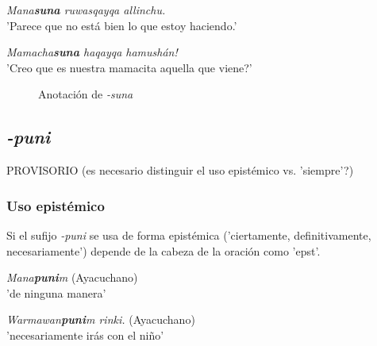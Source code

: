 \documentclass[a4paper,11pt,DIV12]{scrartcl}
\begin{document}
\begin{examples}
 \item {\em Mana\textbf{suna} ruwasqayqa allinchu.}\\
      'Parece que no est\'a bien lo que estoy haciendo.'
\item\label{Ex:suna} {\em Mamacha\textbf{suna} haqayqa hamush\'an!}\\
      '{\textquestiondown}Creo que es nuestra mamacita aquella que viene?'\\
    		\hfill{\small \citep[235]{Cusi2}}
\end{examples}

\begin{figure}
 \begin{center}
\caption{Anotaci\'on de {\em -suna}}\label{Fig:suna}
 \end{center}
\end{figure}

  \subsection{{\em-puni}}
PROVISORIO (es necesario distinguir el uso epist\'emico vs. 'siempre'?)
  \subsubsection{Uso epist\'emico}
Si el sufijo {\em -puni} se usa de forma epist\'emica ('ciertamente, definitivamente, necesariamente') depende de la cabeza de la oraci\'on como 'epst'.

\begin{examples}
 \item {\em Mana\textbf{puni}m} (Ayacuchano)\\
      'de ninguna manera'
 \item {\em Warmawan\textbf{puni}m rinki.} (Ayacuchano)\\
      'necesariamente ir\'as con el ni\~no'\\
    		\hfill{\small \citep[128]{Soto76a}}
\end{examples}
\end{document}
